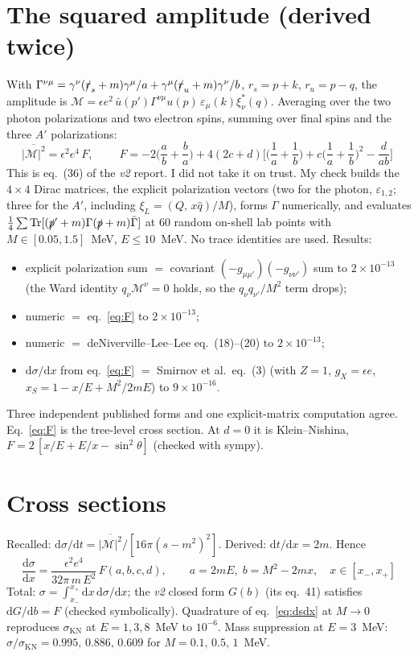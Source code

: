 \documentclass[11pt,a4paper]{article}
\newcommand{\Ap}{A'}
\newcommand{\eps}{\epsilon}
\newcommand{\KN}{\mathrm{KN}}
\newcommand{\dd}{\mathrm{d}}
\begin{document}
\section{The squared amplitude (derived twice)}
With $\Gamma^{\nu\mu}=\gamma^\nu(\slashed r_s+m)\gamma^\mu/a+\gamma^\mu(\slashed r_u+m)\gamma^\nu/b$,
$r_s=p+k$, $r_u=p-q$, the amplitude is $\mathcal M=\eps e^2\,\bar u(p')\Gamma^{\nu\mu}u(p)\,\varepsilon_\mu(k)\xi^*_\nu(q)$.
Averaging over the two photon polarizations and two electron spins, summing over final spins and the three $\Ap$
polarizations:
\begin{equation}
\overline{|\mathcal M|^2}=\eps^2e^4\,F,\qquad
\boxed{\;F=-2\Big(\frac ab+\frac ba\Big)+4(2c+d)\Big[\Big(\frac1a+\frac1b\Big)+c\Big(\frac1a+\frac1b\Big)^2-\frac{d}{ab}\Big]\;}
\label{eq:F}
\end{equation}
This is eq.~(36) of the \emph{v2} report. I did not take it on trust. My check builds the $4\times4$ Dirac matrices,
the explicit polarization vectors (two for the photon, $\varepsilon_{1,2}$; three for the $\Ap$, including
$\xi_L=(Q,\,x\hat q)/M$), forms $\Gamma$ numerically, and evaluates
$\tfrac14\sum\mathrm{Tr}[(\slashed p'+m)\Gamma(\slashed p+m)\bar\Gamma]$ at 60 random on-shell lab points with
$M\in[0.05,1.5]$~MeV, $E\le10$~MeV. No trace identities are used. Results:
\begin{itemize}
\item explicit polarization sum $=$ covariant $(-g_{\mu\mu'})(-g_{\nu\nu'})$ sum to $2\times10^{-13}$ (the Ward identity
$q_\nu\mathcal M^\nu=0$ holds, so the $q_\nu q_{\nu'}/M^2$ term drops);
\item numeric $=$ eq.~\eqref{eq:F} to $2\times10^{-13}$;
\item numeric $=$ deNiverville--Lee--Lee eq.~(18)--(20) to $2\times10^{-13}$;
\item $\dd\sigma/\dd x$ from eq.~\eqref{eq:F} $=$ Smirnov et al.\ eq.~(3) (with $Z=1$, $g_X=\eps e$, $x_S=1-x/E+M^2/2mE$)
to $9\times10^{-16}$.
\end{itemize}
Three independent published forms and one explicit-matrix computation agree. Eq.~\eqref{eq:F} is the tree-level
cross section. At $d=0$ it is Klein--Nishina, $F=2\,[x/E+E/x-\sin^2\theta]$ (checked with sympy).

\section{Cross sections}
Recalled: $\dd\sigma/\dd t=\overline{|\mathcal M|^2}/[16\pi(s-m^2)^2]$. Derived: $\dd t/\dd x=2m$. Hence
\begin{equation}
\boxed{\;\frac{\dd\sigma}{\dd x}=\frac{\eps^2e^4}{32\pi\,m\,E^2}\,F(a,b,c,d),\qquad a=2mE,\; b=M^2-2mx,\quad x\in[x_-,x_+]\;}
\label{eq:dsdx}
\end{equation}
Total: $\sigma=\int_{x_-}^{x_+}\dd x\,\dd\sigma/\dd x$; the \emph{v2} closed form $G(b)$ (its eq.~41) satisfies
$\dd G/\dd b=F$ (checked symbolically). Quadrature of eq.~\eqref{eq:dsdx} at $M\to0$ reproduces $\sigma_\KN$ at
$E=1,3,8$~MeV to $10^{-6}$. Mass suppression at $E=3$~MeV:
$\sigma/\sigma_\KN=0.995,\,0.886,\,0.609$ for $M=0.1,\,0.5,\,1$~MeV.
\end{document}
